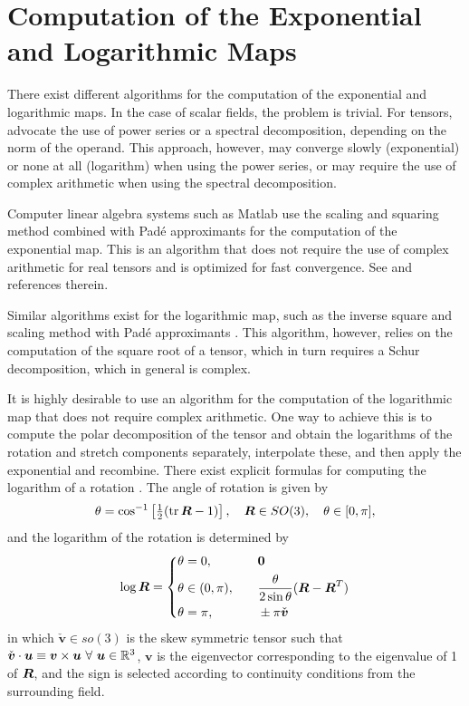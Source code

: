 \documentclass[12pt]{article}
\newcommand{\mbs}[1]{\boldsymbol{#1}}
\newcommand{\mbb}[1]{\mathbb{#1}}
\def\bv{{\mbs{v}}} \def\bw{{\mbs{w}}} \def\bx{{\mbs{x}}}
\DeclareMathOperator{\tr}{tr}
\begin{document}
\section{Computation of the Exponential and Logarithmic Maps}
\label{sec:explogmaps}

There exist different algorithms for the computation of the exponential and
logarithmic maps. In the case of scalar fields, the problem is trivial. For
tensors, \citet*{Ortiz.etal:2001} advocate the use of power series or a spectral
decomposition, depending on the norm of the operand. This approach, however, may
converge slowly (exponential) or none at all (logarithm) when using the power
series, or may require the use of complex arithmetic when using the spectral
decomposition.

Computer linear algebra systems such as Matlab use the scaling and
squaring method combined with Pad\'{e} approximants for the
computation of the exponential map. This is an algorithm that does not
require the use of complex arithmetic for real tensors and is
optimized for fast convergence. See \citep{Higham:2005} and
references therein.

Similar algorithms exist for the logarithmic map, such as the inverse
square and scaling method with Pad\'{e} approximants
\citep{Higham:2001}. This algorithm, however, relies on the
computation of the square root of a tensor, which in turn requires a
Schur decomposition, which in general is complex.

It is highly desirable to use an algorithm for the computation of the
logarithmic map that does not require complex arithmetic. One way to
achieve this is to compute the polar decomposition of the tensor and
obtain the logarithms of the rotation and stretch components
separately, interpolate these, and then apply the exponential and
recombine. There exist explicit formulas for computing the logarithm
of a rotation \citep{Park.Ravani:1997}. The angle of rotation is given
by
\begin{equation}
  \theta = \cos^{-1} \left[  \tfrac{1}{2} (\tr \bR - 1) \right],
  \quad
  \bR \in SO(3),
  \quad
  \theta \in [0, \pi],
\end{equation}
and the logarithm of the rotation is determined by
\begin{align}
  \log \bR =
  \left\{ 
    \begin{aligned}
      & \theta = 0, & \quad & \mathbf{0}
      \\
      & \theta \in (0, \pi), & \quad &
      \frac{\theta}{2 \sin \theta} (\bR - \bR^T)
      \\
      & \theta = \pi, & \quad & \pm \pi \check{\bv}
    \end{aligned}
  \right. \label{eq:log-rotation}
\end{align}
in which $\check{\bv} \in so(3)$ is the skew symmetric tensor such
that $\check{\bv} \cdot \bu \equiv \bv \times \bu \ \forall \ \bu \in
\mbb{R}^3$, $\bv$ is the eigenvector corresponding to the eigenvalue
of 1 of $\bR$, and the sign is selected according to continuity
conditions from the surrounding field.
\end{document}
